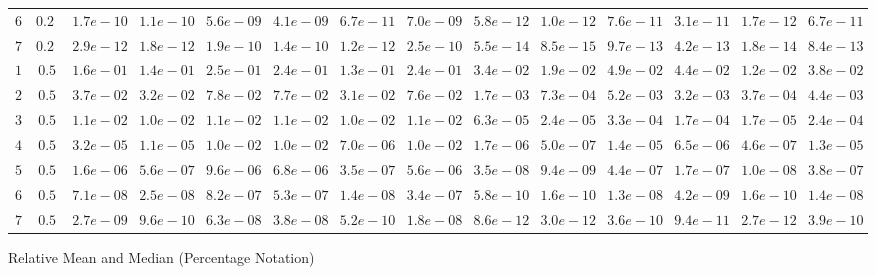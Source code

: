 \begin{tabular}{cccccccccccccc}
$6$ & $0.25$ & $1.7e-10$ & $1.1e-10$ & $5.6e-09$ & $4.1e-09$ & $6.7e-11$ & $7.0e-09$ & $5.8e-12$ & $1.0e-12$ & $7.6e-11$ & $3.1e-11$ & $1.7e-12$ & $6.7e-11$\\
$7$ & $0.25$ & $2.9e-12$ & $1.8e-12$ & $1.9e-10$ & $1.4e-10$ & $1.2e-12$ & $2.5e-10$ & $5.5e-14$ & $8.5e-15$ & $9.7e-13$ & $4.2e-13$ & $1.8e-14$ & $8.4e-13$\\
$1$ & $0.5$ & $1.6e-01$ & $1.4e-01$ & $2.5e-01$ & $2.4e-01$ & $1.3e-01$ & $2.4e-01$ & $3.4e-02$ & $1.9e-02$ & $4.9e-02$ & $4.4e-02$ & $1.2e-02$ & $3.8e-02$\\
$2$ & $0.5$ & $3.7e-02$ & $3.2e-02$ & $7.8e-02$ & $7.7e-02$ & $3.1e-02$ & $7.6e-02$ & $1.7e-03$ & $7.3e-04$ & $5.2e-03$ & $3.2e-03$ & $3.7e-04$ & $4.4e-03$\\
$3$ & $0.5$ & $1.1e-02$ & $1.0e-02$ & $1.1e-02$ & $1.1e-02$ & $1.0e-02$ & $1.1e-02$ & $6.3e-05$ & $2.4e-05$ & $3.3e-04$ & $1.7e-04$ & $1.7e-05$ & $2.4e-04$\\
$4$ & $0.5$ & $3.2e-05$ & $1.1e-05$ & $1.0e-02$ & $1.0e-02$ & $7.0e-06$ & $1.0e-02$ & $1.7e-06$ & $5.0e-07$ & $1.4e-05$ & $6.5e-06$ & $4.6e-07$ & $1.3e-05$\\
$5$ & $0.5$ & $1.6e-06$ & $5.6e-07$ & $9.6e-06$ & $6.8e-06$ & $3.5e-07$ & $5.6e-06$ & $3.5e-08$ & $9.4e-09$ & $4.4e-07$ & $1.7e-07$ & $1.0e-08$ & $3.8e-07$\\
$6$ & $0.5$ & $7.1e-08$ & $2.5e-08$ & $8.2e-07$ & $5.3e-07$ & $1.4e-08$ & $3.4e-07$ & $5.8e-10$ & $1.6e-10$ & $1.3e-08$ & $4.2e-09$ & $1.6e-10$ & $1.4e-08$\\
$7$ & $0.5$ & $2.7e-09$ & $9.6e-10$ & $6.3e-08$ & $3.8e-08$ & $5.2e-10$ & $1.8e-08$ & $8.6e-12$ & $3.0e-12$ & $3.6e-10$ & $9.4e-11$ & $2.7e-12$ & $3.9e-10$\\
\end{tabular}
Relative Mean and Median (Percentage Notation)
